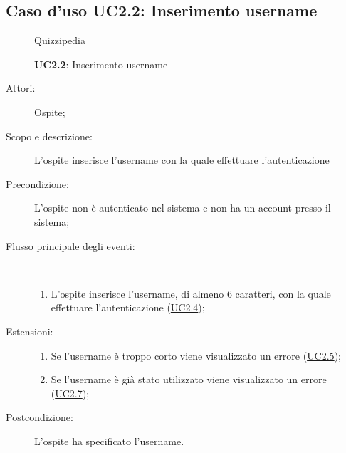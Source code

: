 \subsection{Caso d'uso UC2.2: Inserimento username}
	\begin{figure}[H]
		\centering
		\begin{resizedtikzpicture}{\textwidth}
		\begin{umlsystem}[x=0, fill=lightgray!20]{Quizzipedia}
		\end{umlsystem}
		\end{resizedtikzpicture}
		\caption{\textbf{UC2.2}: Inserimento username}
		\label{UC2.2}
	\end{figure}
\begin{description}
\item[Attori:] Ospite;
\item[Scopo e descrizione:] L'ospite inserisce l'username con la quale effettuare l'autenticazione
      \item[Precondizione:] L'ospite non è autenticato nel sistema e non ha un account presso il sistema;

        \item[Flusso principale degli eventi:] \ 
 \begin{enumerate}
          \item L'ospite inserisce l'username, di almeno 6 caratteri, con la quale effettuare l'autenticazione  (\hyperlink{UC2.4}{UC2.4});

      \end{enumerate}
    \item[Estensioni:]
      \begin{enumerate}
          \item Se l'username è troppo corto viene visualizzato un errore (\hyperlink{UC2.5}{UC2.5});
          \item Se l'username è già stato utilizzato viene visualizzato un errore (\hyperlink{UC2.7}{UC2.7});

      \end{enumerate}
    \item[Postcondizione:] L'ospite ha specificato l'username.
  \end{description}
\hypertarget{UC2.3}{}
